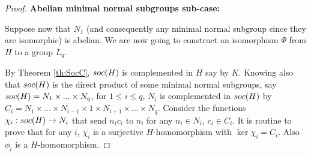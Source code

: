 \begin{proof}
    \vspace{\baselineskip}
    \noindent
    \textbf{Abelian minimal normal subgroups sub-case:}
    \vspace{\baselineskip}

    Suppose now that $N_1$ (and consequently any minimal normal subgroup since they are isomorphic) is abelian. We are now going to construct an isomorphism $\Psi$ from $H$ to a group $L_q$.

    By Theorem \ref{th:SocC}, $soc {(H)}$ is complemented in $H$ say by $K$.
    Knowing also that $soc {(H)}$ is the direct product of some minimal normal subgroups, say $soc {(H)} = N_1 \times...\times N_q$, for $1 \le i \le q$, $N_i$ is complemented in $soc {(H)}$ by $C_i = N_1 \times ... \times N_{i-1} \times 1 \times N_{i+1} \times ... \times N_q$.
    Consider the functions $\chi_i : soc {(H)} \rightarrow N_i$ that send $n_ic_i$ to $n_i$ for any $n_i \in N_i$, $c_i \in C_i$.
    It is routine to prove that for any $i$, $\chi_i$ is a surjective $H$-homomorphism with $\ker \chi_i = C_i$. Also $\phi_i$ is a $H$-homomorphism. 
    

\end{proof}
